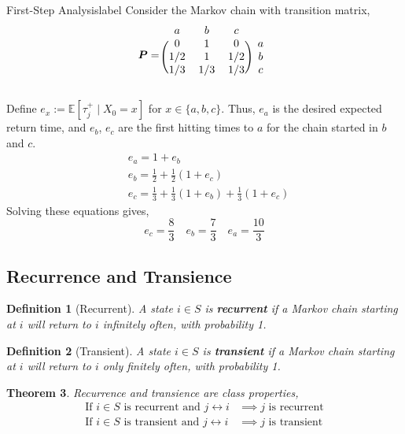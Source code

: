 \documentclass{tufte-handout}
\newtheorem{thm}{Theorem}
\newtheorem{defn}[thm]{Definition}
\begin{document}
  \begin{ex}{First-Step Analysis}{label}
    Consider the Markov chain with transition matrix,
    \[\boldsymbol{P} = \begin{blockarray}{cccc}
    a & b & c \\
    \begin{block}{(ccc)c}
      0 & 1 & 0 & a \\
      1/2 & 1 & 1/2 & b \\
      1/3 & 1/3 & 1/3 & c \\
    \end{block}
    \end{blockarray}\]

    Define $e_x := \mathbb{E}[\tau_j^+ \mid X_0 = x]$ for $x \in \{a, b, c\}$. Thus, $e_a$ is the desired expected return time, and $e_b$, $e_c$ are the first hitting times to $a$ for the chain started in $b$ and $c$.
    \begin{align*}
      &e_a = 1 + e_b \\
      &e_b = \frac{1}{2} + \frac{1}{2}(1 + e_c) \\
      &e_c = \frac{1}{3} + \frac{1}{3}(1 + e_b) + \frac{1}{3}(1 + e_c)
    \end{align*}
    \noindent Solving these equations gives,
    \[e_{c}=\frac{8}{3} \quad e_{b}=\frac{7}{3} \quad e_{a}=\frac{10}{3}\]
  \end{ex}

  \subsection{Recurrence and Transience}
  \begin{defn}[Recurrent]
    A state $i \in S$ is \textbf{recurrent} if a Markov chain starting at $i$ will return to $i$ infinitely often, with probability 1.
  \end{defn}

  \begin{defn}[Transient]
    A state $i \in S$ is \textbf{transient} if a Markov chain starting at $i$ will return to $i$ only finitely often, with probability 1.
  \end{defn}

  \begin{thm}
    Recurrence and transience are class properties,
    \begin{align*}
      \text{If $i \in S$ is recurrent and $j \leftrightarrow i$} &\implies \text{$j$ is recurrent} \\
      \text{If $i \in S$ is transient and $j \leftrightarrow i$} &\implies \text{$j$ is transient}
    \end{align*}
  \end{thm}
\end{document}
